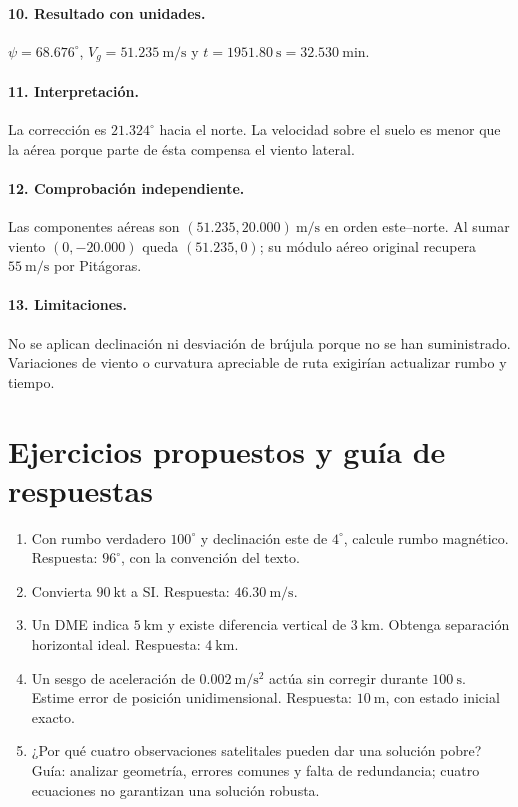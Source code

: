 \paragraph{10. Resultado con unidades.} $\psi=68.676^\circ$, $V_g=51.235\ \mathrm{m/s}$ y $t=1951.80\ \mathrm s=32.530\ \mathrm{min}$.
\paragraph{11. Interpretación.} La corrección es $21.324^\circ$ hacia el norte. La velocidad sobre el suelo es menor que la aérea porque parte de ésta compensa el viento lateral.
\paragraph{12. Comprobación independiente.} Las componentes aéreas son $(51.235,20.000)\ \mathrm{m/s}$ en orden este--norte. Al sumar viento $(0,-20.000)$ queda $(51.235,0)$; su módulo aéreo original recupera $55\ \mathrm{m/s}$ por Pitágoras.
\paragraph{13. Limitaciones.} No se aplican declinación ni desviación de brújula porque no se han suministrado. Variaciones de viento o curvatura apreciable de ruta exigirían actualizar rumbo y tiempo.

\section{Ejercicios propuestos y guía de respuestas}
\begin{enumerate}
\item Con rumbo verdadero $100^\circ$ y declinación este de $4^\circ$, calcule rumbo magnético. Respuesta: $96^\circ$, con la convención del texto.
\item Convierta $90\ \mathrm{kt}$ a SI. Respuesta: $46.30\ \mathrm{m/s}$.
\item Un DME indica $5\ \mathrm{km}$ y existe diferencia vertical de $3\ \mathrm{km}$. Obtenga separación horizontal ideal. Respuesta: $4\ \mathrm{km}$.
\item Un sesgo de aceleración de $0.002\ \mathrm{m/s^2}$ actúa sin corregir durante $100\ \mathrm s$. Estime error de posición unidimensional. Respuesta: $10\ \mathrm m$, con estado inicial exacto.
\item ¿Por qué cuatro observaciones satelitales pueden dar una solución pobre? Guía: analizar geometría, errores comunes y falta de redundancia; cuatro ecuaciones no garantizan una solución robusta.
\end{enumerate}
